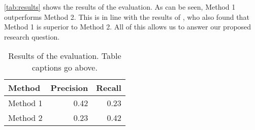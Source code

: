 

\lipsum[2-4]

\autoref{tab:results} shows the results of the evaluation.
As can be seen, Method 1 outperforms Method 2.
This is in line with the results of \citet{phdthesis-kinder}, who also found that Method 1 is superior to Method 2.
All of this allows us to answer our proposed research question.

\begin{table}[t]
    \centering
    \caption{Results of the evaluation. Table captions go above.}
    \label{tab:results}
    \begin{tabularx}{.7\linewidth}{Xrr}
        \toprule
        \textbf{Method} & \textbf{Precision} & \textbf{Recall} \\
        \midrule
        Method 1 & 0.42 & 0.23 \\
        Method 2 & 0.23 & 0.42 \\
        \bottomrule
    \end{tabularx}
\end{table}

\lipsum[2-4]
